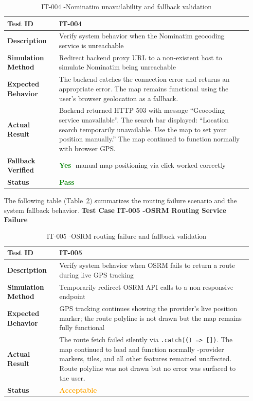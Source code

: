 \begin{table}[H]
\caption{IT-004 -Nominatim unavailability and fallback validation}
\centering
\begin{tabular}{|l|p{10cm}|}
\hline
\textbf{Test ID} & IT-004 \\
\hline
\textbf{Description} & Verify system behavior when the Nominatim geocoding service is unreachable \\
\hline
\textbf{Simulation Method} & Redirect backend proxy URL to a non-existent host to simulate Nominatim being unreachable \\
\hline
\textbf{Expected Behavior} & The backend catches the connection error and returns an appropriate error. The map remains functional using the user's browser geolocation as a fallback. \\
\hline
\textbf{Actual Result} & Backend returned HTTP 503 with message ``Geocoding service unavailable''. The search bar displayed: ``Location search temporarily unavailable. Use the map to set your position manually.'' The map continued to function normally with browser GPS. \\
\hline
\textbf{Fallback Verified} & \textcolor{green}{\textbf{Yes}} -manual map positioning via click worked correctly \\
\hline
\textbf{Status} & \textcolor{green}{\textbf{Pass}} \\
\hline
\end{tabular}

\label{tab:it004}
\end{table}

The following table (Table~\ref{tab:it005}) summarizes the routing failure scenario and the system fallback behavior.
\textbf{Test Case IT-005 -OSRM Routing Service Failure}
\begin{table}[H]
\caption{IT-005 -OSRM routing failure and fallback validation}
\centering
\begin{tabular}{|l|p{10cm}|}
\hline
\textbf{Test ID} & IT-005 \\
\hline
\textbf{Description} & Verify system behavior when OSRM fails to return a route during live GPS tracking \\
\hline
\textbf{Simulation Method} & Temporarily redirect OSRM API calls to a non-responsive endpoint \\
\hline
\textbf{Expected Behavior} & GPS tracking continues showing the provider's live position marker; the route polyline is not drawn but the map remains fully functional \\
\hline
\textbf{Actual Result} & The route fetch failed silently via \texttt{.catch(() => [])}. The map continued to load and function normally -provider markers, tiles, and all other features remained unaffected. Route polyline was not drawn but no error was surfaced to the user. \\
\hline
\textbf{Status} & \textcolor{orange}{\textbf{Acceptable}} \\
\hline
\end{tabular}

\label{tab:it005}
\end{table}

